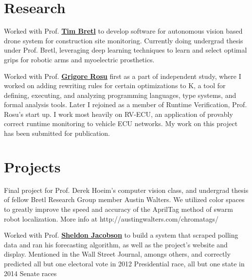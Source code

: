 \documentclass[]{bhargee-resume}
\begin{document}
\begin{minipage}[t]{0.66\textwidth}
\section{Research}
Worked with Prof. \textbf{\href{http://aerospace.illinois.edu/directory/profile/tbretl}{Tim Bretl}} to develop software for autonomous vision based drone system for construction site monitoring. Currently doing undergrad thesis under Prof. Bretl, leveraging deep learning techniques to learn and select optimal grips for robotic arms and myoelectric prosthetics. 
\sectionsep

Worked with Prof. \textbf{\href{http://fsl.cs.illinois.edu/index.php/Grigore_Rosu}{Grigore Rosu}} first as a part of independent study, where I worked on adding rewriting rules for certain optimizations to K, a tool for defining, executing, and analyzing programming languages, type systems, and formal analysis tools. Later I rejoined as a member of Runtime Verification, Prof. Rosu's start up. I work most heavily on RV-ECU, an application of provably correct runtime monitoring to vehicle ECU networks. My work on this project has been submitted for publication.
\sectionsep

\section{Projects}
Final project for Prof. Derek Hoeim's computer vision class, and undergrad thesis of fellow Bretl Research Group member Austin Walters. We utilized color spaces to greatly improve the speed and accuracy of the AprilTag method of swarm robot localization. More info at http://austingwalters.com/chromatags/
\sectionsep

Worked with Prof. \textbf{\href{http://shj.cs.illinois.edu/}{Sheldon Jacobson}} to build a system that scraped polling data and ran his forecasting algorithm, as well as the project's website and display. Mentioned in the Wall Street Journal, amongs others, and correctly predicted all but one electoral vote in 2012 Presidential race, all but one state in 2014 Senate races 
\sectionsep

\end{minipage} 
\end{document}
